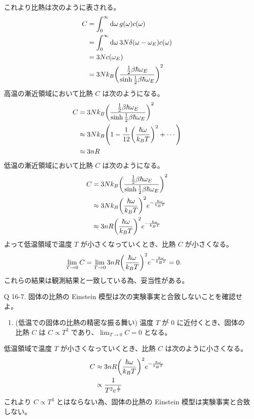 \documentclass[uplatex,dvipdfmx,a4paper,11pt]{jlreq}
\theoremstyle{definition}
\begin{document}
これより比熱は次のように表される。
\begin{align}
  C & = \int_0^\infty\dd{\omega}g(\omega)c(\omega)                                            \\
    & = \int_0^\infty\dd{\omega}3N\delta(\omega - \omega_E)c(\omega)                          \\
    & = 3Nc(\omega_E)                                                                         \\
    & = 3Nk_B\qty(\frac{\frac{1}{2}\beta\hbar\omega_E}{\sinh\frac{1}{2}\beta\hbar\omega_E})^2
\end{align}
高温の漸近領域において比熱 $C$ は次のようになる。
\begin{align}
  C & = 3Nk_B\qty(\frac{\frac{1}{2}\beta\hbar\omega_E}{\sinh\frac{1}{2}\beta\hbar\omega_E})^2 \\
    & \approx 3Nk_B\qty(1 - \frac{1}{12}\qty(\frac{\hbar\omega}{k_BT})^2 + \cdots)            \\
    & \approx 3nR
\end{align}
低温の漸近領域において比熱 $C$ は次のようになる。
\begin{align}
  C & = 3Nk_B\qty(\frac{\frac{1}{2}\beta\hbar\omega_E}{\sinh\frac{1}{2}\beta\hbar\omega_E})^2 \\
    & \approx 3Nk_B\qty(\frac{\hbar\omega}{k_BT})^2e^{-\frac{\hbar\omega}{k_BT}}              \\
    & \approx 3nR\qty(\frac{\hbar\omega}{k_BT})^2e^{-\frac{\hbar\omega}{k_BT}}
\end{align}
よって低温領域で温度 $T$ が小さくなっていくとき、比熱 $C$ が小さくなる。
\begin{align}
  \lim_{T\to 0} C & = \lim_{T\to 0}3nR\qty(\frac{\hbar\omega}{k_BT})^2e^{-\frac{\hbar\omega}{k_BT}} = 0.
\end{align}
これらの結果は観測結果と一致している為、妥当性がある。

\begin{itembox}[l]{Q 16-7.}
  固体の比熱の Einstein 模型は次の実験事実と合致しないことを確認せよ。
  \begin{enumerate}
    \item (低温での固体の比熱の精密な振る舞い) 温度 $T$ が $0$ に近付くとき、固体の比熱 $C$ は $C \propto T^3$ であり、$\lim_{T\to 0} C = 0$ となる。
  \end{enumerate}
\end{itembox}
低温領域で温度 $T$ が小さくなっていくとき、比熱 $C$ は次のように小さくなる。
\begin{align}
  C & \approx 3nR\qty(\frac{\hbar\omega}{k_BT})^2e^{-\frac{\hbar\omega}{k_BT}} \\
    & \propto \frac{1}{T^{2}e^{\frac{1}{T}}}
\end{align}
これより $C \propto T^3$ とはならない為、固体の比熱の Einstein 模型は実験事実と合致しない。
\end{document}
